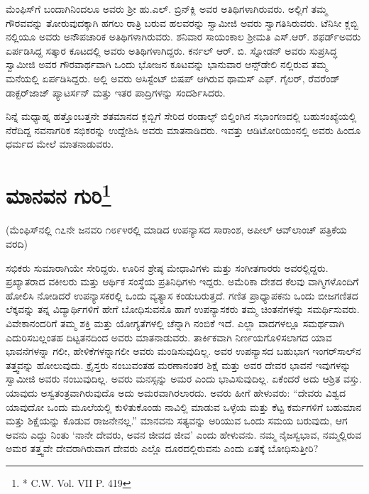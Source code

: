 ಮೆಂಫಿಸ್​ಗೆ ಬಂದಾಗಿನಿಂದಲೂ ಅವರು ಶ‍್ರೀ ಹು.ಎಲ್​. ಬ್ರಿನ್​ಕ್ಲಿ ಅವರ ಅತಿಥಿಗಳಾಗಿರುವರು. ಅಲ್ಲಿಗೆ ತಮ್ಮ ಗೌರವವನ್ನು ತೋರುವುದಕ್ಕಾಗಿ ಹಗಲು ರಾತ್ರಿ ಬರುವ ಹಲವರನ್ನು ಸ್ವಾಮೀಜಿ ಅವರು ಸ್ವಾಗತಿಸಿರುವರು. ಟೆನಿಸೀ ಕ್ಲಬ್ಬಿ ನಲ್ಲಿಯೂ ಅವರು ಅನೌಪಚಾರಿಕ ಅತಿಥಿಗಳಾಗಿರುವರು. ಶನಿವಾರ ಸಾಯಂಕಾಲ ಶ‍್ರೀಮತಿ ಎಸ್​.ಆರ್​. ಶಫರ್ಡ್​ ಅವರು ಏರ್ಪಡಿಸಿದ್ದ ಸತ್ಕಾರ ಕೂಟದಲ್ಲಿ ಅವರು ಅತಿಥಿಗಳಾಗಿದ್ದರು. ಕರ್ನಲ್​ ಆರ್​. ಬಿ. ಸ್ನೋಡನ್​ ಅವರು ಸುಪ್ರಸಿದ್ಧ ಸ್ವಾಮೀಜಿ ಅವರ ಗೌರವಾರ್ಥವಾಗಿ ಒಂದು ಭೋಜನ ಕೂಟವನ್ನು ಭಾನುವಾರ ಆನ್ಸ್​ಡೇಲಿ ನಲ್ಲಿರುವ ತಮ್ಮ ಮನೆಯಲ್ಲಿ ಏರ್ಪಡಿಸಿದ್ದರು. ಅಲ್ಲಿ ಅವರು ಅಸಿಸ್ಟೆಂಟ್​ ಬಿಷಪ್​ ಆಗಿರುವ ಥಾಮಸ್​ ಎಫ್​. ಗೈಲರ್​, ರೆವರೆಂಡ್​ ಡಾಕ್ಟರ್​ ಜಾಜ್​ ಪ್ಯಾಟರ್ಸನ್​ ಮತ್ತು ಇತರ ಪಾದ್ರಿಗಳನ್ನು ಸಂದರ್ಶಿಸಿದರು.

ನಿನ್ನೆ ಮಧ್ಯಾಹ್ನ ಹತ್ತೊಂಬತ್ತನೇ ಶತಮಾನದ ಕ್ಲಬ್ಬಿಗೆ ಸೇರಿದ ರಂಡಾಲ್ಫ್​ ಬಿಲ್ಡಿಂಗಿನ ಸಭಾಂಗಣದಲ್ಲಿ ಬಹುಸಂಖ್ಯೆಯಲ್ಲಿ ನೆರೆದಿದ್ದ ನವನಾಗರಿಕ ಸಭಿಕರನ್ನು ಉದ್ದೇಶಿಸಿ ಅವರು ಮಾತನಾಡಿದರು. ಇವತ್ತು ಆಡಿಟೋರಿಯಂನಲ್ಲಿ ಅವರು ಹಿಂದೂ ಧರ್ಮದ ಮೇಲೆ ಮಾತನಾಡುವರು.

\delimiter


\section[ಮಾನವನ ಗುರಿ]{ಮಾನವನ ಗುರಿ\protect\footnote{* C.W. Vol. VII P. 419}}

\begin{center}
(ಮೆಂಫಿಸ್​ನಲ್ಲಿ ೧೭ನೇ ಜನವರಿ ೧೮೯೪ರಲ್ಲಿ ಮಾಡಿದ ಉಪನ್ಯಾಸದ ಸಾರಾಂಶ, ಅಪೀಲ್​ ಆವ್​ಲಾಂಚ್​ ಪತ್ರಿಕೆಯ ವರದಿ)
\end{center}

ಸಭಿಕರು ಸುಮಾರಾಗಿಯೇ ಸೇರಿದ್ದರು. ಊರಿನ ಶ್ರೇಷ್ಠ ಮೇಧಾವಿಗಳು ಮತ್ತು ಸಂಗೀತಗಾರರು ಅವರಲ್ಲಿದ್ದರು. ಪ್ರಖ್ಯಾತರಾದ ವಕೀಲರು ಮತ್ತು ಆರ್ಥಿಕ ಸಂಸ್ಥೆಯ ಪ್ರತಿನಿಧಿಗಳು ಇದ್ದರು. ಅಮೆರಿಕಾ ದೇಶದ ಕೆಲವು ವಾಗ್ಮಿಗಳೊಂದಿಗೆ ಹೋಲಿಸಿ ನೋಡಿದರೆ ಉಪನ್ಯಾಸಕರಲ್ಲಿ ಒಂದು ವ್ಯತ್ಯಾಸ ಕಂಡುಬರುತ್ತದೆ. ಗಣಿತ ಪ್ರಾಧ್ಯಾಪಕನು ಒಂದು ಬೀಜಗಣಿತದ ಲೆಕ್ಕವನ್ನು ತನ್ನ ವಿದ್ಯಾರ್ಥಿಗಳಿಗೆ ಹೇಗೆ ಬೋಧಿಸುವನೊ ಹಾಗೆ ಉಪನ್ಯಾಸಕರು ತಮ್ಮ ಚಿಂತನೆಗಳನ್ನು ಸಮರ್ಥಿಸುವರು. ವಿವೇಕಾನಂದರಿಗೆ ತಮ್ಮ ಶಕ್ತಿ ಮತ್ತು ಯೋಗ್ಯತೆಗಳಲ್ಲಿ ಚೆನ್ನಾಗಿ ನಂಬಿಕೆ ಇದೆ. ಎಲ್ಲಾ ವಾದಗಳಲ್ಲೂ ಸಮರ್ಥವಾಗಿ ಎದುರಿಸಬಲ್ಲಂತಹ ದಿಟ್ಟತನದಿಂದ ಅವರು ಮಾತನಾಡುವರು. ತಾರ್ಕಿಕವಾಗಿ ನಿರ್ಣಯಗೊಳಿಸಲಾಗದ ಯಾವ ಭಾವನೆಗಳನ್ನಾ ಗಲೀ, ಹೇಳಿಕೆಗಳನ್ನಾಗಲೀ ಅವರು ಮಂಡಿಸುವುದಿಲ್ಲ. ಅವರ ಉಪನ್ಯಾಸದ ಬಹುಭಾಗ ಇಂಗರ್​ಸಾಲ್​ನ ತತ್ತ್ವವನ್ನು ಹೋಲುವುದು. ಕ್ರೈಸ್ತರು ನಂಬುವಂತಹ ಮರಣಾನಂತರ ಶಿಕ್ಷೆ ಮತ್ತು ಅವರ ದೇವರ ಭಾವನೆ ಇವುಗಳನ್ನು ಸ್ವಾಮೀಜಿ ಅವರು ನಂಬುವುದಿಲ್ಲ. ಅವರು ಮನಸ್ಸನ್ನು ಅಮರ ಎಂದು ಭಾವಿಸುವುದಿಲ್ಲ. ಏಕೆಂದರೆ ಅದು ಆಶ್ರಿತ ವಸ್ತು. ಯಾವುದು ಅಸ್ವತಂತ್ರವಾಗಿರುವುದೊ ಅದು ಅಮರವಾಗಿರಲಾರದು. ಅವರು ಹೀಗೆ ಹೇಳುವರು: “ದೇವರು ವಿಶ್ವದ ಯಾವುದೋ ಒಂದು ಮೂಲೆಯಲ್ಲಿ ಕುಳಿತುಕೊಂಡು ನಾವಿಲ್ಲಿ ಮಾಡುವ ಒಳ್ಳೆಯ ಮತ್ತು ಕೆಟ್ಟ ಕರ್ಮಗಳಿಗೆ ಬಹುಮಾನ ಮತ್ತು ಶಿಕ್ಷೆಯನ್ನು ಕೊಡುವ ರಾಜನೇನಲ್ಲ.” ಮಾನವನು ಸತ್ಯವನ್ನು ಅರಿಯುವ ಒಂದು ಸಮಯ ಬರುವುದು, ಆಗ ಅವನು ಎದ್ದು ನಿಂತು ‘ನಾನೇ ದೇವರು, ಅವನ ಜೀವದ ಜೀವ’ ಎಂದು ಹೇಳುವನು. ನಮ್ಮ ನೈಜಸ್ವಭಾವ, ನಮ್ಮಲ್ಲಿರುವ ಅಮರ ತತ್ತ್ವವೇ ದೇವರಾಗಿರುವಾಗ ದೇವರು ಎಲ್ಲೊ ದೂರದಲ್ಲಿರುವನು ಎಂದು ಏತಕ್ಕೆ ಬೋಧಿಸುತ್ತೀರಿ?

